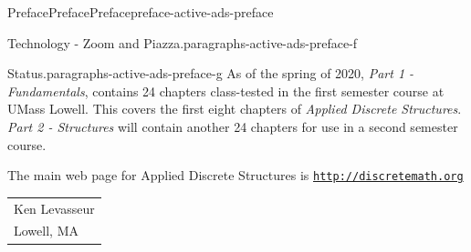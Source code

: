 \documentclass[oneside,10pt,]{book}
\numberwithin{equation}{section}
\begin{document}
\begin{preface}{Preface}{Preface}{}{Preface}{}{}{preface-active-ads-preface}
\begin{paragraphs}{Technology - Zoom and Piazza.}{paragraphs-active-ads-preface-f}
\end{paragraphs}%
\begin{paragraphs}{Status.}{paragraphs-active-ads-preface-g}%
As of the spring of 2020, \emph{Part 1 - Fundamentals}, contains 24 chapters class-tested in the first semester course at UMass Lowell. This covers the first eight chapters of \emph{Applied Discrete Structures}. \emph{Part 2 - Structures} will contain another 24 chapters for use in a second semester course.%
\end{paragraphs}%
\par
The main web page for Applied Discrete Structures is \href{http://discretemath.org}{\nolinkurl{http://discretemath.org}}%
\nopagebreak\par%
\hfill\begin{tabular}[t]{l@{}}
Ken Levasseur\\
Lowell, MA
\end{tabular}\\\par
\end{preface}
\setcounter{tocdepth}{0}
\renewcommand*\contentsname{Contents}
\tableofcontents
\mainmatter
%
%
\typeout{************************************************}
\typeout{************************************************}
%
\end{document}
